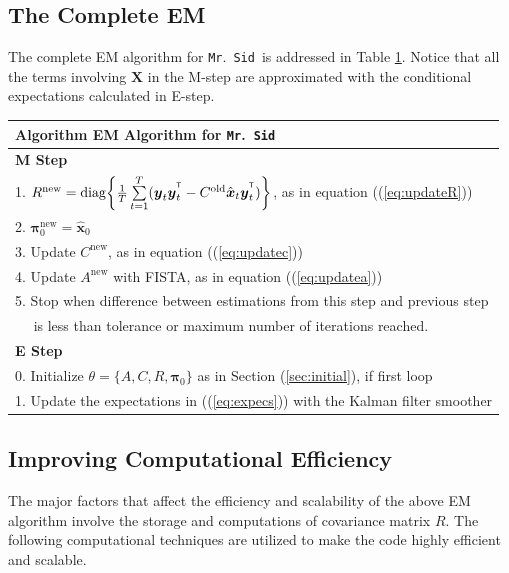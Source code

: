 \documentclass[fleqn,12pt]{article}
\let\oldref\ref
\renewcommand{\ref}[1]{(\oldref{#1})}
\newcommand{\T}{^{\ensuremath{\mathsf{T}}}}           %
\newcommand{\mrsid}{{\sc \texttt{Mr}.~\texttt{Sid}}}
\newcommand{\diag}{\operatornamewithlimits{diag}}
\providecommand{\mb}[1]{\boldsymbol{#1}}
\newcommand{\bx}{\mb{x}}
\newcommand{\by}{\mb{y}}
\newcommand{\bX}{\mb{X}}
\begin{document}
\subsection{The Complete EM}\label{sec:em}
The complete EM algorithm for \mrsid~is addressed in Table \oldref{tab:em}. Notice that all the terms involving $\bX$ in the M-step are approximated with the conditional expectations calculated in E-step.\\
\begin{table}
\label{tab:em}
\begin{tabular}{l}
\hline
\textbf{Algorithm } EM Algorithm for \mrsid\\
\hline
\textbf{M Step}\\
1. $R^{\text{new}}=\diag\biggl\{\frac{1}{T}\sum\limits_{t=1}^{T}(\by_t\by_t^{\T}-C^{\text{old}} \hat{\bx}_t\by_t^{\T})\biggr\}$, as in equation \ref{eq:updateR}\\
2. $\mathbf{\pi}_0^{\text{new}}=\hat{\bx}_0$\\
3. Update $C^{\text{new}}$, as in equation \ref{eq:updatec}\\
4. Update $A^{\text{new}}$ with FISTA, as in equation \ref{eq:updatea}\\
5. Stop when difference between estimations from this step and previous step\\
  $\quad$ is less than tolerance or maximum number of iterations reached.\\
\hline
\textbf{E Step}\\
0. Initialize $\theta =\{A,C,R,\mathbf{\pi}_0\}$ as in Section \oldref{sec:initial}, if first loop\\
1. Update the expectations in \ref{eq:expecs} with the Kalman filter smoother\\
\hline
\end{tabular}
\end{table}

\subsection{Improving Computational Efficiency}
The major factors that affect the efficiency and scalability of the above EM algorithm involve the storage and computations of covariance matrix $R$. The following computational techniques are utilized to make the code highly efficient and scalable.
\end{document}
